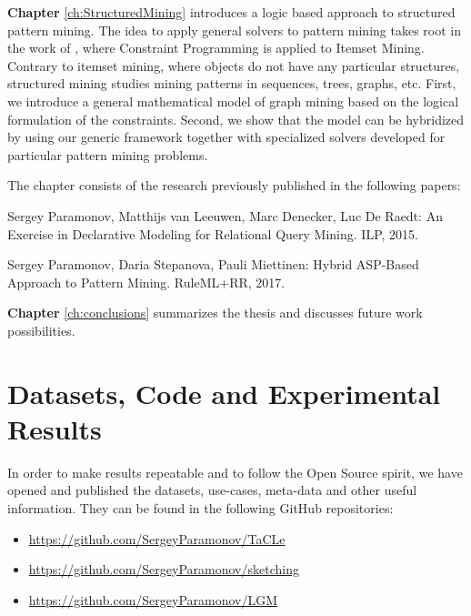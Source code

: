\textbf{Chapter} \ref{ch:StructuredMining} introduces a logic
based approach to structured pattern mining. The idea to apply general
solvers to pattern mining takes root in the work of
\cite{declrativeapproach}, where Constraint Programming is applied to
Itemset Mining. Contrary to itemset mining, where objects do not have
any particular structures, structured mining studies mining patterns
in sequences, trees, graphs, etc. First, we introduce a general
mathematical model of graph mining based on the logical formulation of
the constraints. Second, we show that the model can be hybridized by
using our generic framework together with specialized solvers
developed for particular pattern mining problems.

The chapter consists of the research previously published in the following papers:
\begin{addmargin}[2em]{2em}
Sergey Paramonov, Matthijs van Leeuwen, Marc Denecker, Luc De Raedt:
An Exercise in Declarative Modeling for Relational Query Mining. ILP, 
2015.


Sergey Paramonov, Daria Stepanova, Pauli Miettinen:
Hybrid ASP-Based Approach to Pattern Mining. RuleML+RR, 2017.
\end{addmargin}

\textbf{Chapter} \ref{ch:conclusions} summarizes the thesis and
discusses future work possibilities.

\section{Datasets, Code and Experimental Results}
In order to make results repeatable and to follow the Open Source
spirit, we have opened and published the datasets, use-cases,
meta-data and other useful information.
They can be found in the following GitHub repositories:
\begin{itemize}
\item \url{https://github.com/SergeyParamonov/TaCLe}
\item \url{https://github.com/SergeyParamonov/sketching}
\item \url{https://github.com/SergeyParamonov/LGM}
\end{itemize}
\cleardoublepage

